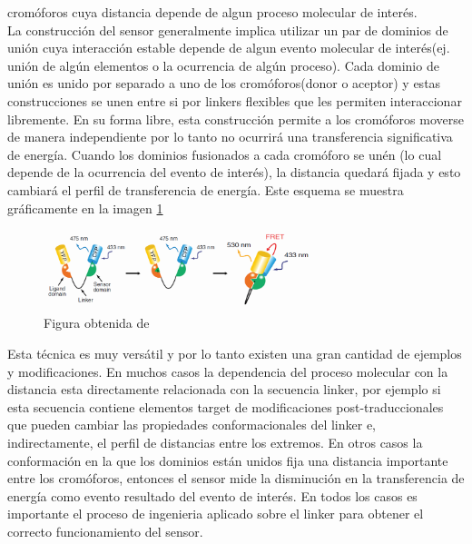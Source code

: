 \begin{itemize}
cromóforos cuya distancia depende de algun proceso molecular de interés. \\
La construcción del sensor generalmente implica utilizar un par de dominios de unión cuya interacción estable depende de algun evento molecular de interés(ej. unión de algún elementos o la ocurrencia de algún proceso).
Cada dominio de unión es unido por separado a uno de los cromóforos(donor o aceptor) y estas construcciones se unen entre si por linkers flexibles que les permiten interaccionar libremente.
En su forma libre, esta construcción permite a los cromóforos moverse de manera independiente por lo tanto no ocurrirá una transferencia significativa de energía. 
Cuando los dominios fusionados a cada cromóforo se unén (lo cual depende de la ocurrencia del evento de interés), la distancia quedará fijada y esto cambiará el perfil de transferencia de energía.
Este esquema se muestra gráficamente en la imagen \ref{fretSensor}

\begin{figure}[htbp]
\centering
\includegraphics[width=0.7\textwidth]{img/fret.png} 
\caption{Figura obtenida de \cite{crone2013gfp}}
\label{fretSensor}
\end{figure}

Esta técnica es muy versátil y por lo tanto existen una gran cantidad de ejemplos y modificaciones.\cite{vinkenborg2009genetically,qiao2006zinc} %
En muchos casos la dependencia del proceso molecular con la distancia esta directamente relacionada con la secuencia linker, 
por ejemplo si esta secuencia contiene elementos target de modificaciones post-traduccionales que pueden cambiar las propiedades conformacionales del linker e, indirectamente, el perfil de distancias entre los extremos. 
En otros casos la conformación en la que los dominios están unidos fija una distancia importante entre los cromóforos, entonces el sensor mide la disminución en la transferencia de energía como evento resultado del evento de interés.
En todos los casos es importante el proceso de ingenieria aplicado sobre el linker para obtener el correcto funcionamiento del sensor.


\end{itemize}
